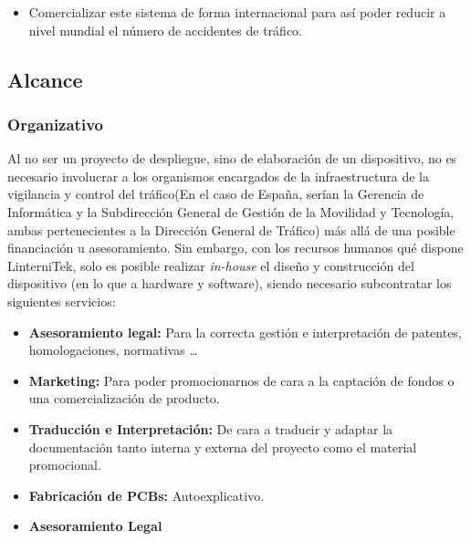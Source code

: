 \documentclass[
	a4paper, %
	12pt, %
]{CSSullivanBusinessReport}
\begin{document}
\begin{fullwidth}
\begin{itemize}
    \item  Comercializar este sistema de forma internacional para así poder reducir a nivel mundial el número de accidentes de tráfico. 
\end{itemize}



\subsection{Alcance}
\subsubsection{Organizativo}
Al no ser un proyecto de despliegue, sino de elaboración de un dispositivo, no es necesario involucrar a los organismos encargados de la infraestructura de la vigilancia y control del tráfico(En el caso de España, serían la Gerencia de Informática y la Subdirección General de Gestión de la Movilidad y Tecnología, ambas pertenecientes a la Dirección General de Tráfico) más allá de una posible financiación u asesoramiento. Sin embargo, con los recursos humanos qué dispone LinterniTek, solo es posible realizar \textit{in-house} el diseño y construcción del dispositivo (en lo que a hardware y software), siendo necesario  subcontratar los siguientes servicios: 
\begin{itemize}
    \item \textbf{Asesoramiento legal:} Para la correcta gestión e interpretación de patentes, homologaciones, normativas \ldots
    \item \textbf{Marketing:} Para poder promocionarnos de cara a la captación de fondos o una comercialización de producto.
    \item \textbf{Traducción e Interpretación:} De cara a traducir y adaptar la documentación tanto interna y externa del proyecto como el material promocional.

    \item \textbf{Fabricación de PCBs:} Autoexplicativo.
\end{itemize}
\begin{itemize}
    \item \textbf{Asesoramiento Legal}
\end{itemize}

\end{fullwidth}
\end{document}
